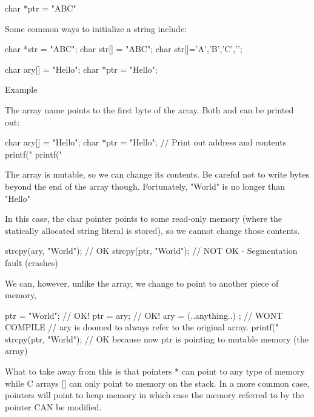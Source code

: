 \begin{code}[language=C]
char *ptr = "ABC"
\end{code}

Some common ways to initialize a string include:

\begin{code}[language=C]
char *str = "ABC";
char str[] = "ABC";
char str[]={'A','B','C','\0'};
\end{code}

\begin{code}[language=C]
char ary[] = "Hello";
char *ptr = "Hello";
\end{code}

Example

The array name points to the first byte of the array. Both 
and  can be printed out:

\begin{code}[language=C]
char ary[] = "Hello";
char *ptr = "Hello";
// Print out address and contents
printf("%
printf("%
\end{code}

The array is mutable, so we can change its contents. Be careful not to write bytes beyond the end of the array though. Fortunately, "World" is no longer than "Hello"

In this case, the char pointer  points to some read-only memory (where the statically allocated string literal is stored), so we cannot change those contents.

\begin{code}[language=C]
strcpy(ary, "World"); // OK
strcpy(ptr, "World"); // NOT OK - Segmentation fault (crashes)
\end{code}

We can, however, unlike the array, we change  to point to
another piece of memory,

\begin{code}[language=C]
ptr = "World"; // OK!
ptr = ary; // OK!
ary = (..anything..) ; // WONT COMPILE
// ary is doomed to always refer to the original array.
printf("%
strcpy(ptr, "World"); // OK because now ptr is pointing to mutable memory (the array)
\end{code}

What to take away from this is that pointers * can point to any type of memory while C arrays {[}{]} can only point to memory on the stack. In a more common case, pointers will point to heap memory in which case the memory referred to by the pointer CAN be modified.

